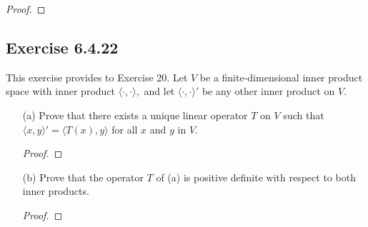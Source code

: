 \begin{proof}
\end{proof}

\subsection*{Exercise 6.4.22} This exercise provides to Exercise 20. Let \( V \) be a finite-dimensional inner product space with inner product \( \langle \cdot , \cdot \rangle, \) and let \( \langle \cdot , \cdot \rangle' \) be any other inner product on \( V  \).
\begin{enumerate}
    \item[(a)] Prove that there exists a unique linear operator \( T  \) on \( V  \) such that \( \langle x , y \rangle' = \langle T(x) , y \rangle  \) for all \( x  \) and \( y  \) in \( V  \). 
        \begin{proof}
        
        \end{proof}
    \item[(b)] Prove that the operator \( T  \) of (a) is positive definite with respect to both inner products.
        \begin{proof}
       
        \end{proof}
\end{enumerate}


